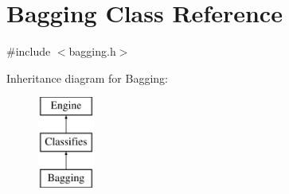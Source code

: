 \hypertarget{classBagging}{
\section{Bagging Class Reference}
\label{classBagging}
}


{\ttfamily \#include $<$bagging.h$>$}

Inheritance diagram for Bagging:\begin{figure}[H]
\begin{center}
\leavevmode
\includegraphics[height=3cm]{classBagging}
\end{center}
\end{figure}
